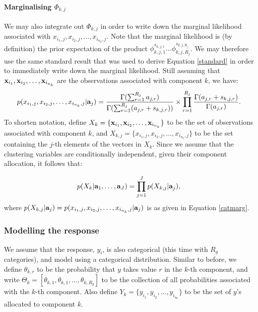 \documentclass[12pt]{article}
\begin{document}
\paragraph{Marginalising $\Phi_{k,j}$}\label{marginphi}
We may also integrate out $\Phi_{k,j}$ in order to write down the marginal likelihood associated with ${ x}_{i_1,j}, { x}_{i_2,j}, \ldots, { x}_{i_{n_k},j}$.  Note that the marginal likelihood is (by definition) the prior expectation of the product $\phi_{k,j,1}^{s_{k,j,1}}\ldots\phi_{k,j,{R_j}}^{s_{k,j,{R_j}}}$.  We may therefore use the same standard result that was used to derive Equation \eqref{standard} in order to immediately write down the marginal likelihood.  Still assuming that ${\bf x}_{i_1}, {\bf x}_{i_2}, \ldots, {\bf x}_{i_{n_k}}$ are the observations associated  with component $k$, we have:
\begin{equation}
p({ x}_{i_1,j}, { x}_{i_2,j}, \ldots, { x}_{i_{n_k},j}| {\bf a}_j) = \frac{\Gamma(\sum_{r=1}^{R_j}a_{j,r} )}{\Gamma(\sum_{r=1}^{R_j}(a_{j,r}+ s_{k,j,r}) )}\times \prod_{r = 1}^{R_j} \frac{\Gamma(a_{j,r} + s_{k,j,r})}{\Gamma(a_{j,r})}.\label{catmarg}
\end{equation}
To shorten notation, define $X_{k} = \{ {\bf x}_{i_1}, {\bf x}_{i_2}, \ldots, {\bf x}_{i_{n_k}} \}$ to be the set of observations associated with component $k$, and $X_{k, j} = \{ { x}_{i_1,j}, { x}_{i_2,j}, \ldots, { x}_{i_{n_k},j} \}$ to be the set containing the $j$-th elements of the vectors in $X_{k}$.  Since we assume that the clustering variables are conditionally independent, given their component allocation, it follows that:
    
\begin{equation}
p(X_{k}| {\bf a}_1, \ldots, {\bf a}_J) = \prod_{j = 1}^J p(X_{k,j}|{\bf a}_j),\label{marglikelix}
\end{equation}
where $p(X_{k,j}|{\bf a}_j) = p({ x}_{i_1,j}, { x}_{i_2,j}, \ldots, { x}_{i_{n_k},j}| {\bf a}_j)$ is as given in Equation \eqref{catmarg}.

\subsubsection{Modelling the response}

We assume that the response, $y_i$, is also categorical (this time with $R_y$ categories), and model using a categorical distribution.  Similar to before, we define $\theta_{k,r}$ to be the probability that $y$ takes value $r$ in the $k$-th component, and write $\Theta_k = [\theta_{k,1}, \theta_{k,1}, \ldots, \theta_{k,{R_y}}]$ to be the collection of all probabilities associated with the $k$-th component.  Also define $Y_k = \{y_{i_1}, y_{i_2}, \ldots, y_{i_{n_k}} \}$ to be the set of $y$'s allocated to component $k$.  
\end{document}
